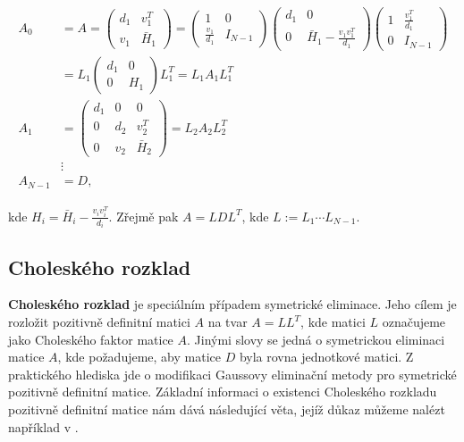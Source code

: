 \documentclass{ctuthesis}
\theoremstyle{plain}
\theoremstyle{definition}
\begin{document}
\begin{gather}
\begin{aligned}
\label{SymEl}
A_0 & = A = \left( \begin{matrix}
               d_1 & v_1^T \\
               v_1 & \bar{H}_1
             \end{matrix} \right)
           =\left(\begin{matrix}
              1               & 0 \\
              \frac{v_1}{d_1} & I_{N-1}
            \end{matrix} \right)
            \left(\begin{matrix}
              d_1 & 0 \\
              0   & \bar{H}_1-\frac{v_1v_1^T}{d_1}
            \end{matrix} \right)
            \left(\begin{matrix}
              1 & \frac{v_1^T}{d_1} \\
              0 & I_{N-1}
            \end{matrix} \right) \\
    &     = L_1
            \left(\begin{matrix}
              d_1 & 0 \\
              0 & H_1
            \end{matrix} \right)
            L_1^T
          = L_1 A_1 L_1^T \\
  A_1 & = \left( \begin{matrix}
               d_1 &  0   & 0 \\
               0   &  d_2 & v_2^T \\
               0   &  v_2 & \bar{H}_2
             \end{matrix} \right)
        =  L_2 A_2 L_2^T \\
    & \vdots \\
  A_{N-1} & = D,
\end{aligned}
\end{gather}

kde $H_i=\bar{H}_i-\frac{v_i v_i^T}{d_i}$.
Zřejmě pak $A = LDL^T$, kde $L:=L_1\cdots L_{N-1}$.

\subsection{Choleského rozklad}
\label{CholeskyChapter}
\textbf{Choleského rozklad} je speciálním případem symetrické eliminace. Jeho cílem je rozložit pozitivně definitní matici $A$ na tvar $A=LL^T$, kde matici $L$ označujeme jako Choleského faktor matice $A$. Jinými slovy se jedná o symetrickou eliminaci matice $A$, kde požadujeme, aby matice $D$ byla rovna jednotkové matici. Z praktického hlediska jde o modifikaci Gaussovy eliminační metody pro symetrické pozitivně definitní matice. Základní informaci o existenci Choleského rozkladu pozitivně definitní matice nám dává následující věta, jejíž důkaz můžeme nalézt například v \cite{govl:83}.
\end{document}
